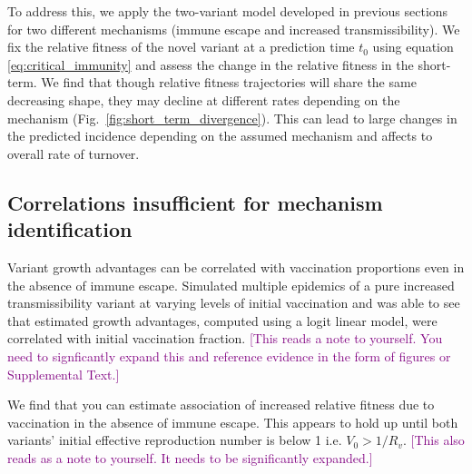 \documentclass[11pt,oneside,letterpaper]{article}
\def\tbc#1{\textcolor{purple}{[#1]}}
\begin{document}
To address this, we apply the two-variant model developed in previous sections for two different mechanisms (immune escape and increased transmissibility).
We fix the relative fitness of the novel variant at a prediction time $t_{0}$ using equation \ref{eq:critical_immunity} and assess the change in the relative fitness in the short-term.
We find that though relative fitness trajectories will share the same decreasing shape, they may decline at different rates depending on the mechanism (Fig.~\ref{fig:short_term_divergence}).
This can lead to large changes in the predicted incidence depending on the assumed mechanism and affects to overall rate of turnover.

\subsection*{Correlations insufficient for mechanism identification}

Variant growth advantages can be correlated with vaccination proportions even in the absence of immune escape.
Simulated multiple epidemics of a pure increased transmissibility variant at varying levels of initial vaccination and was able to see that estimated growth advantages, computed using a logit linear model, were correlated with initial vaccination fraction.
\tbc{This reads a note to yourself. You need to signficantly expand this and reference evidence in the form of figures or Supplemental Text.}

We find that you can estimate association of increased relative fitness due to vaccination in the absence of immune escape.
This appears to hold up until both variants' initial effective reproduction number is below 1 i.e. $V_{0} > 1 / R_{v}$.
\tbc{This also reads as a note to yourself. It needs to be significantly expanded.}
\end{document}

